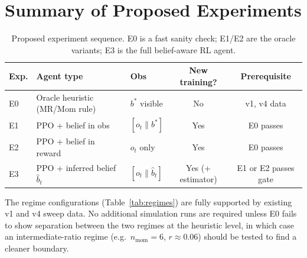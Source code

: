\documentclass[11pt]{article}
\begin{document}
\section{Summary of Proposed Experiments}

\begin{table}[H]
\centering
\begin{tabular}{lllcc}
\toprule
\textbf{Exp.} & \textbf{Agent type} & \textbf{Obs} & \textbf{New training?} & \textbf{Prerequisite} \\
\midrule
E0 & Oracle heuristic (MR/Mom rule) & $b^*$ visible & No & v1, v4 data \\
E1 & PPO + belief in obs & $[o_t \| b^*]$ & Yes & E0 passes \\
E2 & PPO + belief in reward & $o_t$ only & Yes & E0 passes \\
E3 & PPO + inferred belief $\hat{b}_t$ & $[o_t \| \hat{b}_t]$ & Yes (+ estimator) & E1 or E2 passes gate \\
\bottomrule
\end{tabular}
\caption{Proposed experiment sequence. E0 is a fast sanity check; E1/E2 are the
         oracle variants; E3 is the full belief-aware RL agent.}
\label{tab:experiments}
\end{table}

\bigskip
\noindent
The regime configurations (Table~\ref{tab:regimes}) are fully supported by
existing v1 and v4 sweep data.
No additional simulation runs are required unless E0 fails to show
separation between the two regimes at the heuristic level, in which case
an intermediate-ratio regime (e.g.\ $n_\text{mom}=6$, $r\approx 0.06$)
should be tested to find a cleaner boundary.
\end{document}
